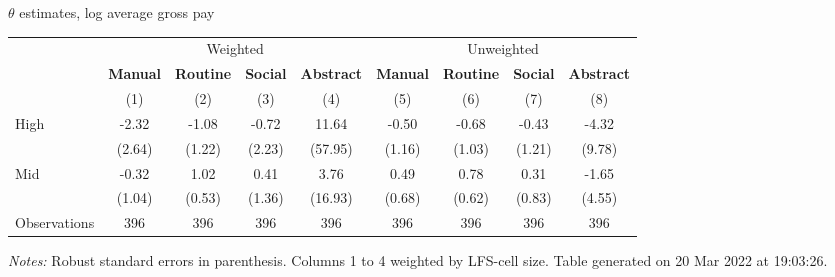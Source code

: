 \begin{center}
\begin{threeparttable}[!h]
\caption{$ \theta $ estimates, log average gross pay}
\begin{tabular}{lcccccccc}
\toprule
\toprule
& \multicolumn{4}{c}{Weighted} & \multicolumn{4}{c}{Unweighted} \\
&\multicolumn{1}{c}{\textbf{Manual}}&\multicolumn{1}{c}{\textbf{Routine}}&\multicolumn{1}{c}{\textbf{Social}}&\multicolumn{1}{c}{\textbf{Abstract}}&\multicolumn{1}{c}{\textbf{Manual}}&\multicolumn{1}{c}{\textbf{Routine}}&\multicolumn{1}{c}{\textbf{Social}}&\multicolumn{1}{c}{\textbf{Abstract}} \\
\textbf{}&\multicolumn{1}{c}{(1)}&\multicolumn{1}{c}{(2)}&\multicolumn{1}{c}{(3)}&\multicolumn{1}{c}{(4)}&\multicolumn{1}{c}{(5)}&\multicolumn{1}{c}{(6)}&\multicolumn{1}{c}{(7)}&\multicolumn{1}{c}{(8)} \\
\midrule
High                &       -2.32&       -1.08&       -0.72&       11.64&       -0.50&       -0.68&       -0.43&       -4.32\\
                    &      (2.64)&      (1.22)&      (2.23)&     (57.95)&      (1.16)&      (1.03)&      (1.21)&      (9.78)\\
Mid                 &       -0.32&        1.02&        0.41&        3.76&        0.49&        0.78&        0.31&       -1.65\\
                    &      (1.04)&      (0.53)&      (1.36)&     (16.93)&      (0.68)&      (0.62)&      (0.83)&      (4.55)\\
Observations        &         396&         396&         396&         396&         396&         396&         396&         396\\
\bottomrule
\bottomrule
\end{tabular}
\begin{tablenotes}
\item \footnotesize \textit{Notes:} Robust standard errors in parenthesis. Columns 1 to 4 weighted by LFS-cell size. Table generated on 20 Mar 2022 at 19:03:26.
\end{tablenotes}
\end{threeparttable}
\end{center}
